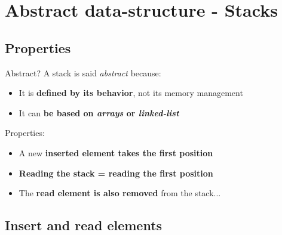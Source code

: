 \documentclass{beamer}[10pt, usepdftitle=false, handout]
\begin{document}
		
	\section{Abstract data-structure - Stacks}
	\subsection{Properties}
	
	\begin{frame}
			
	\begin{exampleblock}{Abstract?}
		A stack is said \textit{abstract} because:
		\begin{itemize}
			\item {It is \textbf{defined by its behavior}, not its memory management}
			\item {It can \textbf{be based on \textit{arrays} or \textit{linked-list}}}
		\end{itemize}
	\end{exampleblock}
	
	\vspace*{1em}
		
	Properties:
	
	\begin{itemize}
	\item {A new \textbf{inserted element takes the first position}\footnotemark[6]}
	\item {\textbf{Reading the stack = reading the first position}\footnotemark[6]}	
	\item {The \textbf{read element is also removed} from the stack\footnotemark[6]...}
	\end{itemize}
	
	
	\end{frame}
	
	\subsection{Insert and read elements}	
	
\end{document}
